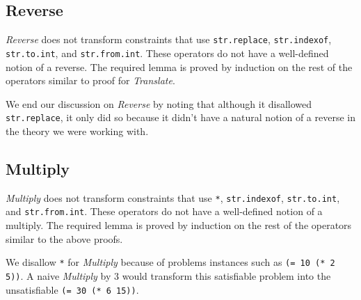 \subsection{Reverse}
\textit{Reverse} does not transform constraints that use
\texttt{str.replace}, \texttt{str.indexof}, \texttt{str.to.int}, and
\texttt{str.from.int}. These operators do not have a well-defined
notion of a reverse. The required lemma is proved by induction on the
rest of the operators similar to proof for \textit{Translate}.

We end our discussion on \textit{Reverse} by noting that although it
disallowed \texttt{str.replace}, it only did so because it didn't have
a natural notion of a reverse in the theory we were working with.

\subsection{Multiply}
\textit{Multiply} does not transform constraints that use \texttt{*},
\texttt{str.indexof}, \texttt{str.to.int}, and
\texttt{str.from.int}. These operators do not have a well-defined
notion of a multiply. The required lemma is proved by induction on the
rest of the operators similar to the above proofs.

We disallow \texttt{*} for \textit{Multiply} because of problems
instances such as \texttt{(= 10 (* 2 5))}. A naive \textit{Multiply}
by $3$ would transform this satisfiable problem into the unsatisfiable
\texttt{(= 30 (* 6 15))}.
